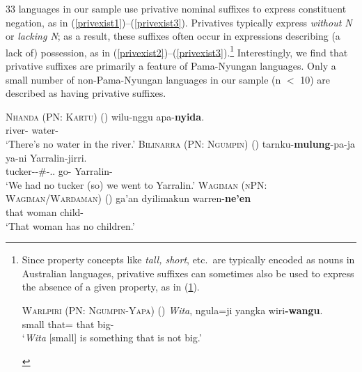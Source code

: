 \documentclass[12pt,egregdoesnotlikesansseriftitles]{scrartcl}
\begin{document}
33 languages in our sample use privative nominal suffixes to express constituent negation, as in (\ref{privexist1})--(\ref{privexist3}). Privatives typically express \textit{without N} or \textit{lacking N}; as a result, these suffixes often occur in expressions describing (a lack of) possession, as in (\ref{privexist2})--(\ref{privexist3}).\footnote{Since property concepts like \textit{tall, short}, etc.\ are typically encoded as nouns in Australian languages, privative suffixes can sometimes also be used to express the absence of a given property, as in (\ref{privproperty1}).
\vspace{-2mm}
\begin{exe}
  \ex \textsc{Warlpiri (PN: Ngumpin-Yapa)} \hfill (\citealt{wdp})
  \gll \textit{Wita}, ngula=ji yangka wiri\textbf{-wangu}.\\
  small that=\Top{} that big-\Priv\\
  \glt `\textit{Wita} [small] is something that is not big.'\label{privproperty1}
\end{exe}
} Interestingly, we find that privative suffixes are primarily a feature of Pama-Nyungan languages. Only a small number of non-Pama-Nyungan languages in our sample (n $<$ 10) are described as having privative suffixes.

\begin{exe}
  \ex \textsc{Nhanda (PN: Kartu)} \hfill (\citealt[64]{blevins01}) \label{privexist1}
  \gll wilu-nggu apa-\textbf{nyida}.\\
  river-\Loc{} water-\Priv\\
  \glt `There's no water in the river.'
  \ex\label{privexist2}\textsc{Bilinarra (PN: Ngumpin)} \hfill (\citealt[122]{nordlinger90})
  \gll tarnku-\textbf{mulung}-pa-ja ya-ni Yarralin-jirri.\\
  tucker-\Priv-\#-\Fdu.\Excl.\Sarg{} go-\Pst{} Yarralin-\All\\
  \glt `We had no tucker (so) we went to Yarralin.'
  \ex \textsc{Wagiman (nPN: Wagiman/Wardaman)} \hfill (\citealt[150]{wilson06})
  \gll ga'an dyilimakun warren-\textbf{ne'en}\\ %
  that woman child-\Priv\\
  \glt `That woman has no children.' \label{privexist3}
\end{exe}
\end{document}
